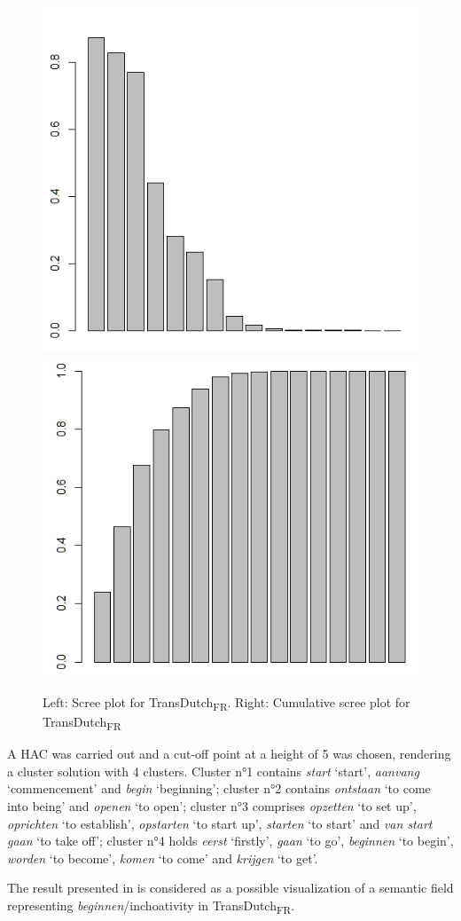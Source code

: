 \begin{figure}
\includegraphics[width=.48\textwidth]{figures/Vandevoorde2-img76.png}\hfill%
\includegraphics[width=.48\textwidth]{figures/Vandevoorde2-img77.png}
\caption{\label{fig:4:74}Left: Scree plot for TransDutch\textsubscript{FR}. \label{fig:4:75}Right: Cumulative scree plot for TransDutch\textsubscript{FR}}
\end{figure}

A HAC was carried out and a cut-off point at a height of 5 was chosen, rendering a cluster solution with 4 clusters. Cluster n°1 contains \textit{start} `start', \textit{aanvang} `commencement' and \textit{begin} `beginning'; cluster n°2 contains \textit{ontstaan} `to come into being' and \textit{openen} `to open'; cluster n°3 comprises \textit{opzetten} `to set up', \textit{oprichten} `to establish', \textit{opstarten} `to start up', \textit{starten} `to start' and \textit{van start gaan} `to take off'; cluster n°4 holds \textit{eerst} `firstly', \textit{gaan} `to go', \textit{beginnen} `to begin', \textit{worden} `to become', \textit{komen} `to come' and \textit{krijgen} `to get'.

The result presented in  is considered as a possible visualization of a semantic field representing \textit{beginnen}/inchoativity in TransDutch\textsubscript{FR}.

